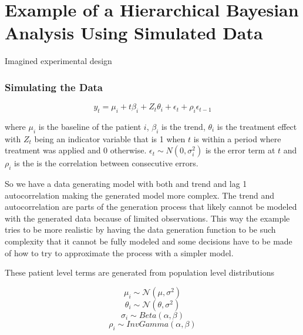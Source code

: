 \documentclass[12pt,a4paper,leqno]{report}
\theoremstyle{plain}
\theoremstyle{definition}
\theoremstyle{remark}
\begin{document}
\chapter{Example of a Hierarchical Bayesian Analysis Using Simulated Data}\label{example}

Imagined experimental design

\subsection{Simulating the Data}

\begin{def}\label{simulationmodel}
    \begin{equation}\label{}
        y_t = \mu_i + t\beta_i + Z_t\theta_i + \epsilon_t + \rho_i\epsilon_{t-1}
    \end{equation}
\end{def}where \(\mu_i\) is the baseline of the patient \(i\), \(\beta_i\) is the trend,
\(\theta_i\) is the treatment effect with \(Z_t\) being an indicator variable that is 1 when
\(t\) is within a period where treatment was applied and 0 otherwise.
\(\epsilon_t \sim N(0,\sigma_i^2) \) is the error term at \(t\) and \(\rho_i\) is the is the correlation
between consecutive errors.

So we have a data generating model with both and trend and lag 1 autocorrelation making the
generated model more complex. The trend and autocorrelation are parts of the generation process
that likely cannot be modeled with the generated data because of limited observations.
This way the example tries to be more realistic by having the data generation function
to be such complexity that it cannot be fully modeled and some decisions have to be made
of how to try to approximate the process with a simpler model.

These patient level terms are generated from population level distributions

\begin{def}\label{populationparameters}
    \begin{equation}
        \mu_i \sim \mathcal{N}(\mu,\sigma^2)
    \end{equation}
    \begin{equation}
        \theta_i \sim \mathcal{N}(\theta,\sigma^2)
    \end{equation}
    \begin{equation}
        \sigma_i \sim Beta(\alpha, \beta)
    \end{equation}
    \begin{equation}
        \rho_i \sim InvGamma(\alpha, \beta)
    \end{equation}
\end{def}
\end{document}
